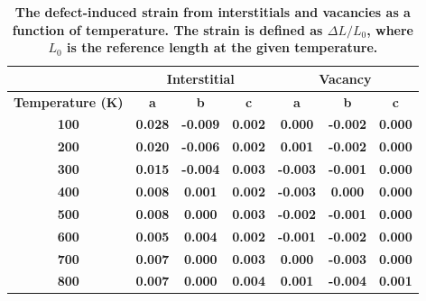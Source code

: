 \documentclass[utf8]{frontiersSCNS} %
\providecommand{\DIFaddtex}[1]{{\bf #1}} %
\providecommand{\DIFaddend}{\protect\color{black}} %
\providecommand{\DIFaddFL}[1]{\DIFadd{#1}} %
\providecommand{\DIFadd}[1]{\texorpdfstring{\DIFaddtex{#1}}{#1}} %
\begin{document}
\begin{table}[h]
\caption{\DIFaddFL{The defect-induced strain from interstitials and vacancies as a function of temperature. The strain is defined as $\Delta L/L_0$, where $L_0$ is the reference length at the given temperature. }} \label{tab:strain}
\begin{center}
\begin{tabular}{|c|c|c|c|c|c|c|}
	\hline
	& \multicolumn{3}{c|}{Interstitial} & \multicolumn{3}{c|}{Vacancy} \\
	 \hline
\DIFaddFL{Temperature (K)  }&	\DIFaddFL{a	}& \DIFaddFL{b	}& \DIFaddFL{c }& \DIFaddFL{a }& \DIFaddFL{b }& \DIFaddFL{c }\\
\hline
\DIFaddFL{100	}&\DIFaddFL{0.028	}&\DIFaddFL{-0.009	}&\DIFaddFL{0.002}&		\DIFaddFL{0.000	}&\DIFaddFL{-0.002	}&\DIFaddFL{0.000 }\\
\DIFaddFL{200	}&\DIFaddFL{0.020	}&\DIFaddFL{-0.006	}&\DIFaddFL{0.002}&		\DIFaddFL{0.001	}&\DIFaddFL{-0.002	}&\DIFaddFL{0.000 }\\
\DIFaddFL{300	}&\DIFaddFL{0.015	}&\DIFaddFL{-0.004	}&\DIFaddFL{0.003}&		\DIFaddFL{-0.003	}&\DIFaddFL{-0.001	}&\DIFaddFL{0.000 }\\
\DIFaddFL{400	}&\DIFaddFL{0.008	}&\DIFaddFL{0.001	}&\DIFaddFL{0.002}&		\DIFaddFL{-0.003	}&\DIFaddFL{0.000	}&\DIFaddFL{0.000 }\\
\DIFaddFL{500	}&\DIFaddFL{0.008	}&\DIFaddFL{0.000	}&\DIFaddFL{0.003}&		\DIFaddFL{-0.002	}&\DIFaddFL{-0.001	}&\DIFaddFL{0.000 }\\
\DIFaddFL{600	}&\DIFaddFL{0.005	}&\DIFaddFL{0.004	}&\DIFaddFL{0.002}&		\DIFaddFL{-0.001	}&\DIFaddFL{-0.002	}&\DIFaddFL{0.000 }\\
\DIFaddFL{700	}&\DIFaddFL{0.007	}&\DIFaddFL{0.000	}&\DIFaddFL{0.003}&		\DIFaddFL{0.000	}&\DIFaddFL{-0.003	}&\DIFaddFL{0.000 }\\
\DIFaddFL{800	}&\DIFaddFL{0.007	}&\DIFaddFL{0.000	}&\DIFaddFL{0.004}&		\DIFaddFL{0.001	}&\DIFaddFL{-0.004	}&\DIFaddFL{0.001 }\\
	 \hline
\end{tabular}
\end{center}
\label{default}
\end{table}

\FloatBarrier
\DIFaddend 

 

\end{document}
